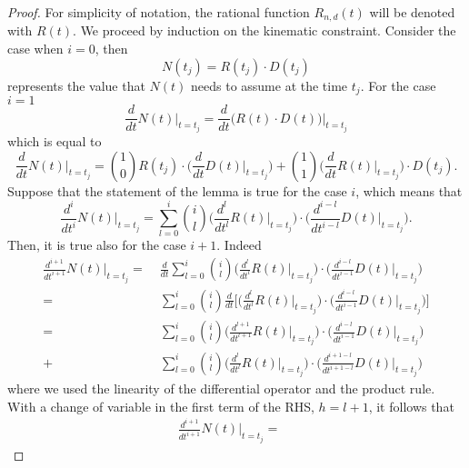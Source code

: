 \begin{proof}
For simplicity of notation, the rational function $R_{n,d}(t)$ will be denoted with $R(t)$.
We proceed by induction on the kinematic constraint. Consider the case when $i=0$, then
\begin{equation}
N(t_j) = R(t_j)\cdot D(t_j)
\end{equation}
represents the value that $N(t)$ needs to assume at the time $t_j$. For the case $i=1$
\begin{equation}
\frac{d}{dt}N(t)\biggr|_{t=t_j} = \frac{d}{dt} \biggl(R(t)\cdot D(t)\biggr)\biggr|_{t=t_j}
\end{equation}
which is equal to
\begin{equation}
\frac{d}{dt}N(t)\biggr|_{t=t_j} = \binom{1}{0}R(t_j) \cdot \biggr( \frac{d}{dt}D(t)\bigr|_{t=t_j}\biggr) + \binom{1}{1} \biggr( \frac{d}{dt}R(t)\bigr|_{t=t_j}\biggr) \cdot D(t_j) .
\end{equation}
Suppose that the statement of the lemma is true for the case $i$, which means that
\begin{equation}
\frac{d^i}{dt^i}N(t)\biggr|_{t=t_j} = \sum_{l=0}^{i}{\binom{i}{l}\biggr(\frac{d^l}{dt^l}R(t)\bigr|_{t=t_j}\biggr) \cdot \biggr(\frac{d^{i-l}}{dt^{i-l}}D(t)\bigr|_{t=t_j}}\biggr).
\end{equation}
Then, it is true also for the case $i+1$. Indeed
\begin{align}
\frac{d^{i+1}}{dt^{i+1}}N(t)\biggr|_{t=t_j} = &\; 
\frac{d}{dt}\sum_{l=0}^{i}{ \binom{i}{l}\biggr(\frac{d^l}{dt^l}R(t)\bigr|_{t=t_j}\biggr) \cdot \biggr(\frac{d^{i-l}}{dt^{i-1}}D(t)\bigr|_{t=t_j}\biggr)} \nonumber \\
= &\; \sum_{l=0}^{i}{\binom{i}{l} \frac{d}{dt}\Biggl[ \biggr(\frac{d^l}{dt^l}R(t)\bigr|_{t=t_j}\biggr) \cdot \biggr(\frac{d^{i-l}}{dt^{i-1}}D(t)\bigr|_{t=t_j}\biggr)\Biggr] }  \nonumber \\ 
= &\; \sum_{l=0}^{i}{\binom{i}{l} \biggr(\frac{d^{l+1}}{dt^{l+1}}R(t)\bigr|_{t=t_j}\biggr) \cdot \biggr(\frac{d^{i-l}}{dt^{i-1}}D(t)\bigr|_{t=t_j}}\biggr) \nonumber \\
+ &\; \sum_{l=0}^{i}{\binom{i}{l} \biggr(\frac{d^{l}}{dt^{l}}R(t)\bigr|_{t=t_j}\biggr) \cdot \biggr(\frac{d^{i+1-l}}{dt^{i+1-l}}D(t)\bigr|_{t=t_j}\biggr)}
\end{align}
where we used the linearity of the differential operator and the product rule. With a change of variable in the first term of the RHS, $h=l+1$, it follows that
\begin{align}
\frac{d^{i+1}}{dt^{i+1}}N(t)\biggr|_{t=t_j} = &\; 

\end{align}
\end{proof}
